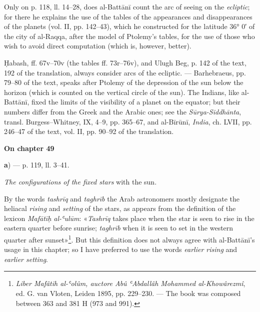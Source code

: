 \documentclass[11pt]{article}
\newcommand{\UnitHead}[2]{\par\setcounter{footnoteT}{0}\needspace{8\baselineskip}\bigskip\pdfbookmark[1]{#1}{unit-#2}\hypertarget{EN-#2}{}%
 {\large\bfseries\interlinepenalty=10000 #1\par}\nobreak\medskip}
\begin{document}
\par Only on p. 118, ll. 14–28, does al-Battānī count the arc of seeing on the \emph{ecliptic}; for there he explains the use of the tables of the appearances and disappearances of the planets (vol. II, pp. 142–43), which he constructed for the latitude 36° 0′ of the city of al-Raqqa, after the model of Ptolemy's tables, for the use of those who wish to avoid direct computation (which is, however, better).\par
\par Ḥabash, ff. 67v–70v (the tables ff. 73r–76v), and Ulugh Beg, p. 142 of the text, 192 of the translation, always consider arcs of the ecliptic. — Barhebraeus, pp. 79–80 of the text, speaks after Ptolemy of the depression of the sun below the horizon (which is counted on the vertical circle of the sun). The Indians, like al-Battānī, fixed the limits of the visibility of a planet on the equator; but their numbers differ from the Greek and the Arabic ones; see the \emph{Sūrya-Siddhānta}, transl. Burgess–Whitney, IX, 4–9, pp. 365–67, and al-Bīrūnī, \emph{India}, ch. LVII, pp. 246–47 of the text, vol. II, pp. 90–92 of the translation.\par
\UnitHead{On chapter 49}{A49}
\par\begin{center}\textbf{a}) — p. 119, ll. 3–41.\end{center}
\par \emph{The configurations of the fixed stars} with the sun.\par
\par By the words \emph{tashrīq} and \emph{taghrīb} the Arab astronomers mostly designate the heliacal \emph{rising} and \emph{setting} of the stars, as appears from the definition of the lexicon \emph{Mafātīḥ al-ʿulūm}: «\emph{Tashrīq} takes place when the star is seen to rise in the eastern quarter before sunrise; \emph{taghrīb} when it is seen to set in the western quarter after sunset»\footnote{\emph{Liber Mafâtih al-ʿolûm, auctore Abû ʿAbdallâh Mohammed al-Khowârezmî}, ed. G. van Vloten, Leiden 1895, pp. 229–230. — The book was composed between 363 and 381 H (973 and 991).}. But this definition does not always agree with al-Battānī's usage in this chapter; so I have preferred to use the words \emph{earlier rising} and \emph{earlier setting}.\par
\end{document}
